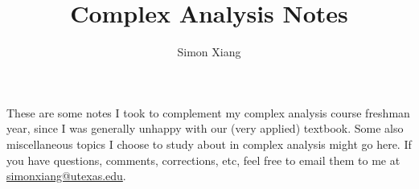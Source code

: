 \documentclass[fontsize=9pt]{article}
\date{}
\author{Simon Xiang}
\title{Complex Analysis Notes}
\begin{document}
\maketitle
These are some notes I took to complement my complex analysis course freshman year, since I was generally unhappy with our (very applied) textbook. Some also miscellaneous topics I choose to study about in complex analysis might go here. If you have questions, comments, corrections, etc, feel free to email them to me at \url{simonxiang@utexas.edu}.
\tableofcontents
    \newpage
    
    
    
\end{document}
